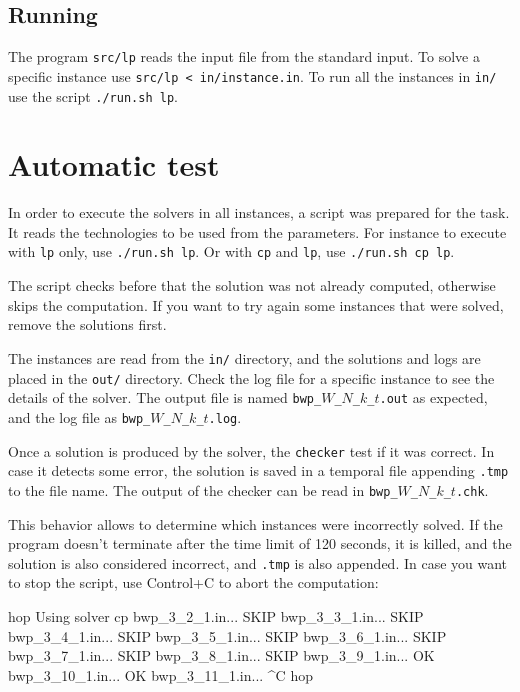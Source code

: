 \documentclass[a4paper]{article}
\begin{document}
\subsection{Running}

The program \texttt{src/lp} reads the input file from the standard input. To 
solve a specific instance use \texttt{src/lp < in/instance.in}. To run all the 
instances in \texttt{in/} use the script \texttt{./run.sh lp}.

\section{Automatic test}

In order to execute the solvers in all instances, a script was prepared for the 
task. It reads the technologies to be used from the parameters. For instance to 
execute with \texttt{lp} only, use \texttt{./run.sh lp}. Or with \texttt{cp} and 
\texttt{lp}, use \texttt{./run.sh cp lp}.

The script checks before that the solution was not already computed, otherwise 
skips the computation. If you want to try again some instances that were solved, 
remove the solutions first.

The instances are read from the \texttt{in/} directory, and the solutions and 
logs are placed in the \texttt{out/} directory. Check the log file for a 
specific instance to see the details of the solver. The output file is named 
\texttt{bwp\_$W$\_$N$\_$k$\_$t$.out} as expected, and the log file as 
\texttt{bwp\_$W$\_$N$\_$k$\_$t$.log}.

Once a solution is produced by the solver, the \texttt{checker} test if it was 
correct. In case it detects some error, the solution is saved in a temporal file 
appending \texttt{.tmp} to the file name. The output of the checker can be read 
in \texttt{bwp\_$W$\_$N$\_$k$\_$t$.chk}.

This behavior allows to determine which instances were incorrectly solved. If 
the program doesn't terminate after the time limit of 120 seconds, it is killed, 
and the solution is also considered incorrect, and \texttt{.tmp} is also 
appended. In case you want to stop the script, use Control+C to abort the 
computation:
%
\begin{textcode}
hop%
Using solver cp
bwp_3_2_1.in... SKIP
bwp_3_3_1.in... SKIP
bwp_3_4_1.in... SKIP
bwp_3_5_1.in... SKIP
bwp_3_6_1.in... SKIP
bwp_3_7_1.in... SKIP
bwp_3_8_1.in... SKIP
bwp_3_9_1.in... OK
bwp_3_10_1.in... OK
bwp_3_11_1.in... ^C
hop%
\end{textcode}
\end{document}
